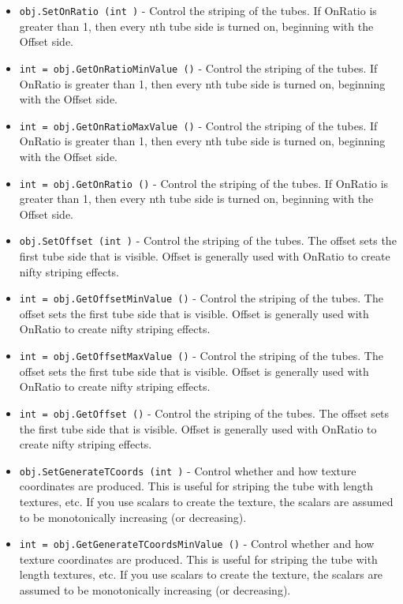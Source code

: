 \begin{itemize}
\item  \verb|obj.SetOnRatio (int )| -  Control the striping of the tubes. If OnRatio is greater than 1,
 then every nth tube side is turned on, beginning with the Offset
 side.

\item  \verb|int = obj.GetOnRatioMinValue ()| -  Control the striping of the tubes. If OnRatio is greater than 1,
 then every nth tube side is turned on, beginning with the Offset
 side.

\item  \verb|int = obj.GetOnRatioMaxValue ()| -  Control the striping of the tubes. If OnRatio is greater than 1,
 then every nth tube side is turned on, beginning with the Offset
 side.

\item  \verb|int = obj.GetOnRatio ()| -  Control the striping of the tubes. If OnRatio is greater than 1,
 then every nth tube side is turned on, beginning with the Offset
 side.

\item  \verb|obj.SetOffset (int )| -  Control the striping of the tubes. The offset sets the
 first tube side that is visible. Offset is generally used with
 OnRatio to create nifty striping effects.

\item  \verb|int = obj.GetOffsetMinValue ()| -  Control the striping of the tubes. The offset sets the
 first tube side that is visible. Offset is generally used with
 OnRatio to create nifty striping effects.

\item  \verb|int = obj.GetOffsetMaxValue ()| -  Control the striping of the tubes. The offset sets the
 first tube side that is visible. Offset is generally used with
 OnRatio to create nifty striping effects.

\item  \verb|int = obj.GetOffset ()| -  Control the striping of the tubes. The offset sets the
 first tube side that is visible. Offset is generally used with
 OnRatio to create nifty striping effects.

\item  \verb|obj.SetGenerateTCoords (int )| -  Control whether and how texture coordinates are produced. This is
 useful for striping the tube with length textures, etc. If you
 use scalars to create the texture, the scalars are assumed to be
 monotonically increasing (or decreasing).

\item  \verb|int = obj.GetGenerateTCoordsMinValue ()| -  Control whether and how texture coordinates are produced. This is
 useful for striping the tube with length textures, etc. If you
 use scalars to create the texture, the scalars are assumed to be
 monotonically increasing (or decreasing).


\end{itemize}
